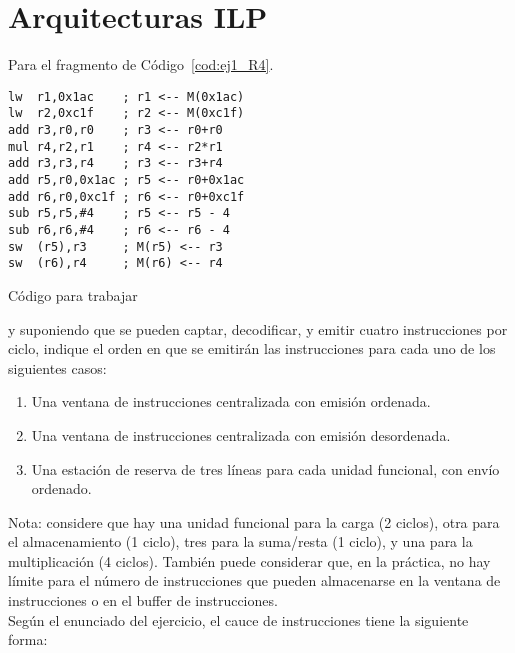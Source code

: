 \section{Arquitecturas ILP}

\begin{ejercicio}
    Para el fragmento de Código~\ref{cod:ej1_R4}.
    \begin{listing}[H]
    \begin{verbatim}
lw  r1,0x1ac    ; r1 <-- M(0x1ac)
lw  r2,0xc1f    ; r2 <-- M(0xc1f)
add r3,r0,r0    ; r3 <-- r0+r0
mul r4,r2,r1    ; r4 <-- r2*r1
add r3,r3,r4    ; r3 <-- r3+r4
add r5,r0,0x1ac ; r5 <-- r0+0x1ac
add r6,r0,0xc1f ; r6 <-- r0+0xc1f
sub r5,r5,#4    ; r5 <-- r5 - 4
sub r6,r6,#4    ; r6 <-- r6 - 4
sw  (r5),r3     ; M(r5) <-- r3
sw  (r6),r4     ; M(r6) <-- r4
    \end{verbatim}
    \caption{Código para trabajar}
    \label{cod:ej1_R4}
\end{listing}
y suponiendo que se pueden captar, decodificar, y emitir cuatro instrucciones por ciclo, indique el orden en que se emitirán las instrucciones para cada uno de los siguientes casos:
\begin{enumerate}
    \item Una ventana de instrucciones centralizada con emisión ordenada.
    \item Una ventana de instrucciones centralizada con emisión desordenada.
    \item Una estación de reserva de tres líneas para cada unidad funcional, con envío ordenado.
\end{enumerate}

Nota: considere que hay una unidad funcional para la carga (2 ciclos), otra para el almacenamiento (1 ciclo), tres para la suma/resta (1 ciclo), y una para la multiplicación (4 ciclos). También puede considerar que, en la práctica, no hay límite para el número de instrucciones que pueden almacenarse en la ventana de instrucciones o en el buffer de instrucciones.\\

Según el enunciado del ejercicio, el cauce de instrucciones tiene la siguiente forma:

\begin{figure}[H]
\centering
{}
\end{figure}
\end{ejercicio}

